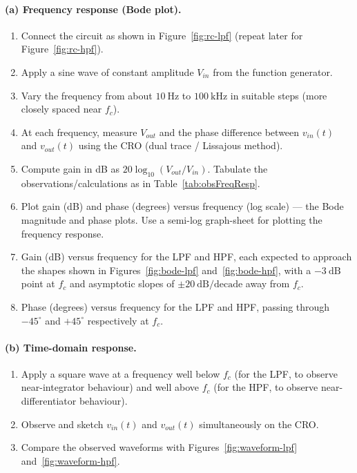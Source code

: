 \paragraph{(a) Frequency response (Bode plot).}
\begin{enumerate}
	\item Connect the circuit as shown in Figure~\ref{fig:rc-lpf} (repeat later for Figure~\ref{fig:rc-hpf}).
	\item Apply a sine wave of constant amplitude $V_{in}$ from the function generator.
	\item Vary the frequency from about $10\ \text{Hz}$ to $100\ \text{kHz}$ in suitable steps (more closely spaced near $f_c$).
	\item At each frequency, measure $V_{out}$ and the phase difference between $v_{in}(t)$ and $v_{out}(t)$ using the CRO (dual trace / Lissajous method). 
	\item Compute gain in dB as $20\log_{10}(V_{out}/V_{in})$. Tabulate the observations/calculations as in Table~\ref{tab:obsFreqResp}.
	\item Plot gain (dB) and phase (degrees) versus frequency (log scale) --- the Bode magnitude and phase plots. Use a semi-log graph-sheet for plotting the frequency response.
	\item Gain (dB) versus frequency for the LPF and HPF, each expected to approach the shapes shown in Figures~\ref{fig:bode-lpf} and~\ref{fig:bode-hpf}, 		with a $-3\ \text{dB}$ point at $f_c$ and asymptotic slopes of $\pm 20\ \text{dB/decade}$ away from $f_c$.
	\item Phase (degrees) versus frequency for the LPF and HPF, passing through $-45^\circ$ and $+45^\circ$ respectively at $f_c$.
\end{enumerate}

\paragraph{(b) Time-domain response.}
\begin{enumerate}
	\item Apply a square wave at a frequency well below $f_c$ (for the LPF, to observe near-integrator behaviour) and well above $f_c$ (for the HPF, to observe near-differentiator behaviour).
	\item Observe and sketch $v_{in}(t)$ and $v_{out}(t)$ simultaneously on the CRO.
	\item Compare the observed waveforms with Figures~\ref{fig:waveform-lpf} and~\ref{fig:waveform-hpf}.
\end{enumerate}

